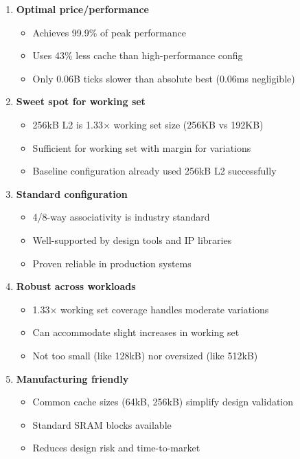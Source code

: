 \documentclass[11pt,a4paper]{article}
\begin{document}
\begin{enumerate}[noitemsep]
    \item \textbf{Optimal price/performance}
    \begin{itemize}[noitemsep]
        \item Achieves 99.9\% of peak performance
        \item Uses 43\% less cache than high-performance config
        \item Only 0.06B ticks slower than absolute best (0.06ms negligible)
    \end{itemize}

    \item \textbf{Sweet spot for working set}
    \begin{itemize}[noitemsep]
        \item 256kB L2 is 1.33× working set size (256KB vs 192KB)
        \item Sufficient for working set with margin for variations
        \item Baseline configuration already used 256kB L2 successfully
    \end{itemize}

    \item \textbf{Standard configuration}
    \begin{itemize}[noitemsep]
        \item 4/8-way associativity is industry standard
        \item Well-supported by design tools and IP libraries
        \item Proven reliable in production systems
    \end{itemize}

    \item \textbf{Robust across workloads}
    \begin{itemize}[noitemsep]
        \item 1.33× working set coverage handles moderate variations
        \item Can accommodate slight increases in working set
        \item Not too small (like 128kB) nor oversized (like 512kB)
    \end{itemize}

    \item \textbf{Manufacturing friendly}
    \begin{itemize}[noitemsep]
        \item Common cache sizes (64kB, 256kB) simplify design validation
        \item Standard SRAM blocks available
        \item Reduces design risk and time-to-market
    \end{itemize}
\end{enumerate}
\end{document}
